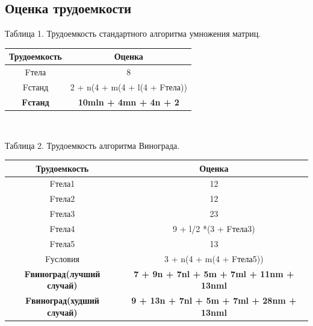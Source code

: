 \documentclass[a4paper, 14pt]{article}
\begin{document}
        \subsection{Оценка трудоемкости}
		\parindent=1cm        
        	\begin{center}
  	Таблица 1. Трудоемкость стандартного алгоритма умножения матриц.\\
	\end{center}
        \begin{tabular}{ | c | c | }
        \hline
		Трудоемкость & Оценка\\ \hline
		Fтела & 8\\ \hline
		Fстанд & 2 + n(4 + m(4 + l(4 + Fтела))\\ \hline
		\textbf{Fстанд} & \textbf{10mln + 4mn + 4n + 2}\\
		\hline
        \end{tabular}\\
                
        	\begin{center}
  	Таблица 2. Трудоемкость алгоритма Винограда.\\
	\end{center}        \begin{tabular}{ | c | c | }
        \hline
		Трудоемкость & Оценка\\ \hline
		Fтела1 & 12\\ \hline
		Fтела2 & 12\\ \hline
		Fтела3 & 23\\ \hline
		Fтела4 & 9 + l/2 *(3 + Fтела3)\\ \hline
		Fтела5 & 13\\ \hline
		Fусловия & 3 + n(4 + m(4 + Fтела5)) \\ \hline
		\textbf{Fвиноград(лучший случай)} & \textbf{7 + 9n + 7nl + 5m + 7ml + 11nm + 13nml}\\ \hline
		\textbf{Fвиноград(худший случай)} & \textbf{9 + 13n + 7nl + 5m + 7ml + 28nm + 13nml}\\ \hline
		\hline
        \end{tabular}\\
\end{document}
